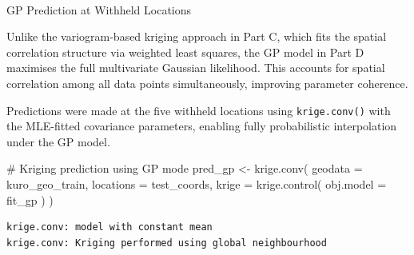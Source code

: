 \documentclass[
  11pt,
]{article}
\makeatletter
\let\oldparagraph\paragraph
\renewcommand{\paragraph}{
    \@ifstar
      \xxxParagraphStar
      \xxxParagraphNoStar
  }
\newcommand{\xxxParagraphStar}[1]{\oldparagraph*{#1}\mbox{}}
\newcommand{\xxxParagraphNoStar}[1]{\oldparagraph{#1}\mbox{}}
\newenvironment{Shaded}{\begin{snugshade}}{\end{snugshade}}
\newcommand{\AttributeTok}[1]{\textcolor[rgb]{0.40,0.45,0.13}{#1}}
\newcommand{\CommentTok}[1]{\textcolor[rgb]{0.37,0.37,0.37}{#1}}
\newcommand{\FunctionTok}[1]{\textcolor[rgb]{0.28,0.35,0.67}{#1}}
\newcommand{\NormalTok}[1]{\textcolor[rgb]{0.00,0.23,0.31}{#1}}
\newcommand{\OtherTok}[1]{\textcolor[rgb]{0.00,0.23,0.31}{#1}}
\newcommand{\SpecialCharTok}[1]{\textcolor[rgb]{0.37,0.37,0.37}{#1}}
\makeatother
\begin{document}
\paragraph{GP Prediction at Withheld
Locations}\label{gp-prediction-at-withheld-locations}

Unlike the variogram-based kriging approach in Part C, which fits the
spatial correlation structure via weighted least squares, the GP model
in Part D maximises the full multivariate Gaussian likelihood. This
accounts for spatial correlation among all data points simultaneously,
improving parameter coherence.

Predictions were made at the five withheld locations using
\texttt{krige.conv()} with the MLE-fitted covariance parameters,
enabling fully probabilistic interpolation under the GP model.

\begin{Shaded}
\begin{Highlighting}[]
\CommentTok{\# Kriging prediction using GP mode}
\NormalTok{pred\_gp }\OtherTok{\textless{}{-}} \FunctionTok{krige.conv}\NormalTok{(}
  \AttributeTok{geodata =}\NormalTok{ kuro\_geo\_train,}
  \AttributeTok{locations =}\NormalTok{ test\_coords,}
  \AttributeTok{krige =} \FunctionTok{krige.control}\NormalTok{(}
    \AttributeTok{obj.model =}\NormalTok{ fit\_gp}
\NormalTok{  )}
\NormalTok{)}
\end{Highlighting}
\end{Shaded}

\begin{verbatim}
krige.conv: model with constant mean
krige.conv: Kriging performed using global neighbourhood 
\end{verbatim}

\begin{Shaded}
\end{Shaded}
\end{document}
